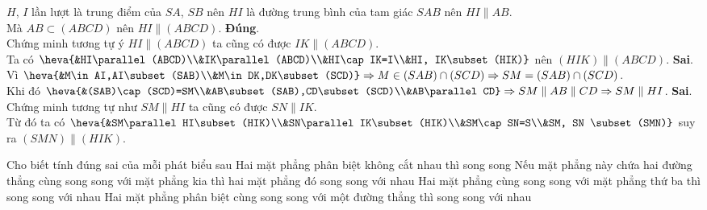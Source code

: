 \begin{ex}
{\begin{itemchoice}
			$H$, $I$ lần lượt là trung điểm của $SA$, $SB$ nên $HI$ là đường  trung bình của tam giác $SAB$ nên $HI\parallel AB$.\\
			Mà  $AB\subset(ABCD) $ nên $ HI\parallel(ABCD)$.
			 \itemch \textbf{Đúng}.\\
			Chứng minh tương  tự ý $HI\parallel(ABCD)$ ta cũng có được $IK\parallel(ABCD)$.\\
			Ta có $\heva{&HI\parallel(ABCD)\\&IK\parallel(ABCD)\\&HI\cap IK=I\\&HI, IK\subset (HIK)}$ nên  $(HIK)\parallel(ABCD)$.
			 \itemch \textbf{Sai}.\\
			Vì $\heva{&M\in AI,AI\subset (SAB)\\&M\in DK,DK\subset (SCD)} \Rightarrow M\in  (SAB)\cap (SCD) \Rightarrow SM=(SAB)\cap (SCD)$.\\
			Khi  đó $\heva{&(SAB)\cap (SCD)=SM\\&AB\subset (SAB),CD\subset (SCD)\\&AB\parallel CD} \Rightarrow SM\parallel AB\parallel CD \Rightarrow SM\parallel HI $.
			\itemch  \textbf{Sai}.\\
			Chứng minh tương tự như  $SM\parallel HI$ ta cũng có được $SN\parallel IK$.\\
			Từ đó ta có $\heva{&SM\parallel HI\subset (HIK)\\&SN\parallel IK\subset (HIK)\\&SM\cap SN=S\\&SM, SN \subset (SMN)}$ suy ra $(SMN)\parallel  (HIK)$.
		\end{itemchoice}
	 }
\end{ex}

\begin{ex}%
	Cho biết  tính đúng sai của mỗi phát biểu sau
	\choiceTF 
		{\True  Hai mặt phẳng phân biệt không cắt nhau thì song song}
		{Nếu mặt phẳng này chứa hai đường thẳng cùng song song với mặt  phẳng kia thì hai mặt phẳng đó song song với nhau}
		{Hai mặt phẳng cùng song song với mặt phẳng thứ  ba thì song song với nhau}
		 {Hai mặt phẳng phân biệt cùng song song với một đường thẳng thì song song với nhau}
\end{ex}


